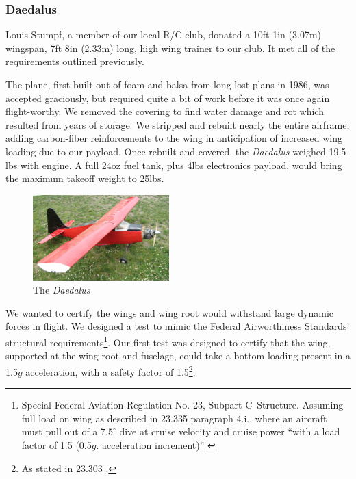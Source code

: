 \documentclass[pdftex,10pt,letter]{article}
\newcommand{\degrees}[1]
{
\begin{math}
#1^{\circ} 
\end{math}
}
\begin{document}
\subsubsection{Daedalus}

Louis Stumpf, a member of our local R/C club, donated a 10ft 1in (3.07m) wingspan, 7ft 8in (2.33m) long, high wing trainer to our club. It met all of the requirements outlined previously.

The plane, first built out of foam and balsa from long-lost plans in 1986, was accepted graciously, but required quite a bit of work before it was once again flight-worthy. We removed the covering to find water damage and rot which resulted from years of storage. We stripped and rebuilt nearly the entire airframe, adding carbon-fiber reinforcements to the wing in anticipation of increased wing loading due to our payload. Once rebuilt and covered,  the \emph{Daedalus} weighed 19.5 lbs with engine. A full 24oz fuel tank, plus 4lbs electronics payload, would bring the maximum takeoff weight to 25lbs.
\begin{figure}
	\includegraphics[width=0.47\textwidth]{../images/daedalus_isometric.jpg}
	\caption{The \emph{Daedalus}}
	\label{fig:daedalus}
\end{figure}
We wanted to certify the wings and wing root would withstand large dynamic forces in flight. 
We designed a test to mimic the 
Federal Airworthiness Standards' structural requirements\footnote{Special Federal Aviation Regulation No. 23, Subpart C--Structure. Assuming full load on wing as described in 23.335 paragraph 4.i., where an aircraft must pull out of a \degrees{7.5} dive at cruise velocity and cruise power ``with a load factor of 1.5 (0.5$g$. acceleration increment)'' \cite{far23}}. Our first test was designed to certify that the wing, supported at the wing root and fuselage, could take a bottom loading present in a 1.5$g$ acceleration, with a safety factor of 1.5\footnote{As stated in 23.303 \cite{far23}.}.
\end{document}
